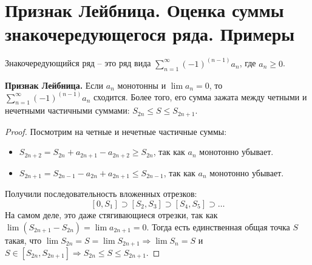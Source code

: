 \section{Признак Лейбница. Оценка суммы знакочередующегося ряда. Примеры}
\begin{conj}
    Знакочередующийся ряд -- это ряд вида $\sum\limits_{n=1}^\infty (-1)^{(n-1)}a_n$, где $a_n \geqslant 0$.
\end{conj}

\textbf{Признак Лейбница.} Если $a_n$ монотонны и $\lim a_n = 0$, то $\sum\limits_{n=1}^\infty (-1)^{(n-1)}a_n$ сходится.
Более того, его сумма зажата между четными и нечетными частичными суммами: $S_{2n} \leqslant S \leqslant S_{2n + 1}$.

\begin{proof}
    Посмотрим на четные и нечетные частичные суммы: \begin{itemize}
        \item $S_{2n + 2} = S_{2n} + a_{2n + 1} - a_{2n + 2} \geqslant  S_{2n}$, так как $a_n$ монотонно убывает.
        \item $S_{2n + 1} = S_{2n - 1} - a_{2n} + a_{2n + 1} \leqslant S_{2n - 1}$, так как $a_n$ монотонно убывает.
    \end{itemize}
    \quad Получили последовательность вложенных отрезков: \[ [0, S_1] \supset [S_2, S_3] \supset [S_4, S_5] \supset \dots \]
    \quad На самом деле, это даже стягивающиеся отрезки, так как $\lim (S_{2n+1} - S_{2n}) = \lim a_{2n+1} = 0$.
    Тогда есть единственная общая точка $S$ такая, что $\lim S_{2n} = S = \lim S_{2n+1} \Rightarrow \lim S_n = S$ и $S \in [S_{2n}, S_{2n+1}] \Rightarrow S_{2n} \leqslant S \leqslant S_{2n+1}$.
\end{proof}

